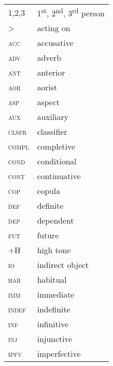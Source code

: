 \documentclass[output=paper]{langsci/langscibook}
\begin{document}
\begin{tabularx}{.45\textwidth}{ll}
1,2,3 & 1\textsuperscript{st}, 2\textsuperscript{nd}, 3\textsuperscript{rd} person\\
>  & acting on  \\
\textsc{acc}  & accusative\\  
\textsc{adv}   & adverb\\
\textsc{ant}   & anterior \\
\textsc{aor}   & aorist\\  
\textsc{asp}   & aspect\\
\textsc{aux}   & auxiliary  \\
\textsc{clsfr}   & classifier  \\
\textsc{compl}   & completive\\
\textsc{cond}   & conditional  \\ 
\textsc{cont}   & continuative  \\
\textsc{cop}   & copula\\
\textsc{def}   & definite\\  
\textsc{dep}   & dependent \\
\textsc{fut}   & future\\
\textsc{+H}   & high tone\\ 
\textsc{io}  & indirect object  \\
\textsc{hab}   & habitual  \\
\textsc{imm}  & immediate\\
\textsc{indef}  & indefinite\\  
\textsc{inf}  & infinitive  \\
\textsc{inj}  & injunctive  \\
\textsc{ipfv}  & imperfective  \\
\end{tabularx}
\end{document}
